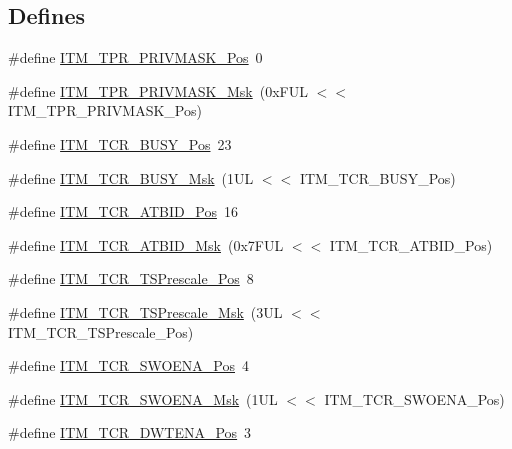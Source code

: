\subsection*{\-Defines}
\begin{DoxyCompactItemize}
\item 
\#define \hyperlink{group___c_m_s_i_s___i_t_m_ga7abe5e590d1611599df87a1884a352e8}{\-I\-T\-M\-\_\-\-T\-P\-R\-\_\-\-P\-R\-I\-V\-M\-A\-S\-K\-\_\-\-Pos}~0
\item 
\#define \hyperlink{group___c_m_s_i_s___i_t_m_ga168e089d882df325a387aab3a802a46b}{\-I\-T\-M\-\_\-\-T\-P\-R\-\_\-\-P\-R\-I\-V\-M\-A\-S\-K\-\_\-\-Msk}~(0x\-F\-U\-L $<$$<$ I\-T\-M\-\_\-\-T\-P\-R\-\_\-\-P\-R\-I\-V\-M\-A\-S\-K\-\_\-\-Pos)
\item 
\#define \hyperlink{group___c_m_s_i_s___i_t_m_ga9174ad4a36052c377cef4e6aba2ed484}{\-I\-T\-M\-\_\-\-T\-C\-R\-\_\-\-B\-U\-S\-Y\-\_\-\-Pos}~23
\item 
\#define \hyperlink{group___c_m_s_i_s___i_t_m_ga43ad7cf33de12f2ef3a412d4f354c60f}{\-I\-T\-M\-\_\-\-T\-C\-R\-\_\-\-B\-U\-S\-Y\-\_\-\-Msk}~(1\-U\-L $<$$<$ I\-T\-M\-\_\-\-T\-C\-R\-\_\-\-B\-U\-S\-Y\-\_\-\-Pos)
\item 
\#define \hyperlink{group___c_m_s_i_s___i_t_m_gad5a179af7ad1f2b8958e50907186529b}{\-I\-T\-M\-\_\-\-T\-C\-R\-\_\-\-A\-T\-B\-I\-D\-\_\-\-Pos}~16
\item 
\#define \hyperlink{group___c_m_s_i_s___i_t_m_ga491d8bddbe6c0523ff10ef6d2846f0f2}{\-I\-T\-M\-\_\-\-T\-C\-R\-\_\-\-A\-T\-B\-I\-D\-\_\-\-Msk}~(0x7\-F\-U\-L $<$$<$ I\-T\-M\-\_\-\-T\-C\-R\-\_\-\-A\-T\-B\-I\-D\-\_\-\-Pos)
\item 
\#define \hyperlink{group___c_m_s_i_s___i_t_m_gad7bc9ee1732032c6e0de035f0978e473}{\-I\-T\-M\-\_\-\-T\-C\-R\-\_\-\-T\-S\-Prescale\-\_\-\-Pos}~8
\item 
\#define \hyperlink{group___c_m_s_i_s___i_t_m_ga7a723f71bfb0204c264d8dbe8cc7ae52}{\-I\-T\-M\-\_\-\-T\-C\-R\-\_\-\-T\-S\-Prescale\-\_\-\-Msk}~(3\-U\-L $<$$<$ I\-T\-M\-\_\-\-T\-C\-R\-\_\-\-T\-S\-Prescale\-\_\-\-Pos)
\item 
\#define \hyperlink{group___c_m_s_i_s___i_t_m_ga7a380f0c8078f6560051406583ecd6a5}{\-I\-T\-M\-\_\-\-T\-C\-R\-\_\-\-S\-W\-O\-E\-N\-A\-\_\-\-Pos}~4
\item 
\#define \hyperlink{group___c_m_s_i_s___i_t_m_ga97476cb65bab16a328b35f81fd02010a}{\-I\-T\-M\-\_\-\-T\-C\-R\-\_\-\-S\-W\-O\-E\-N\-A\-\_\-\-Msk}~(1\-U\-L $<$$<$ I\-T\-M\-\_\-\-T\-C\-R\-\_\-\-S\-W\-O\-E\-N\-A\-\_\-\-Pos)
\item 
\#define \hyperlink{group___c_m_s_i_s___i_t_m_ga30e83ebb33aa766070fe3d1f27ae820e}{\-I\-T\-M\-\_\-\-T\-C\-R\-\_\-\-D\-W\-T\-E\-N\-A\-\_\-\-Pos}~3
$$
\end{DoxyCompactItemize}
